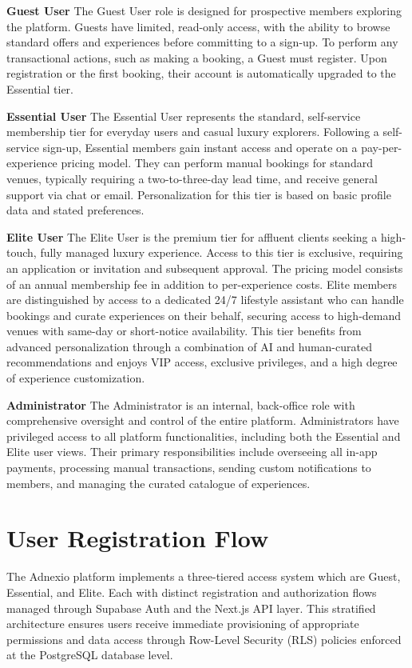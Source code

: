 \textbf{Guest User}
The Guest User role is designed for prospective members exploring the platform. Guests have limited, read-only access, with the ability to browse standard offers and experiences before committing to a sign-up. To perform any transactional actions, such as making a booking, a Guest must register. Upon registration or the first booking, their account is automatically upgraded to the Essential tier.

\textbf{Essential User}
The Essential User represents the standard, self-service membership tier for everyday users and casual luxury explorers. Following a self-service sign-up, Essential members gain instant access and operate on a pay-per-experience pricing model. They can perform manual bookings for standard venues, typically requiring a two-to-three-day lead time, and receive general support via chat or email. Personalization for this tier is based on basic profile data and stated preferences.

\textbf{Elite User}
The Elite User is the premium tier for affluent clients seeking a high-touch, fully managed luxury experience. Access to this tier is exclusive, requiring an application or invitation and subsequent approval. The pricing model consists of an annual membership fee in addition to per-experience costs. Elite members are distinguished by access to a dedicated 24/7 lifestyle assistant who can handle bookings and curate experiences on their behalf, securing access to high-demand venues with same-day or short-notice availability. This tier benefits from advanced personalization through a combination of AI and human-curated recommendations and enjoys VIP access, exclusive privileges, and a high degree of experience customization.

\textbf{Administrator}
The Administrator is an internal, back-office role with comprehensive oversight and control of the entire platform. Administrators have privileged access to all platform functionalities, including both the Essential and Elite user views. Their primary responsibilities include overseeing all in-app payments, processing manual transactions, sending custom notifications to members, and managing the curated catalogue of experiences.

\section{User Registration Flow}
\label{section:User Registration Flow}
The Adnexio platform implements a three-tiered access system which are Guest, Essential, and Elite. Each with distinct registration and authorization flows managed through Supabase Auth and the Next.js API layer. This stratified architecture ensures users receive immediate provisioning of appropriate permissions and data access through Row-Level Security (RLS) policies enforced at the PostgreSQL database level.

